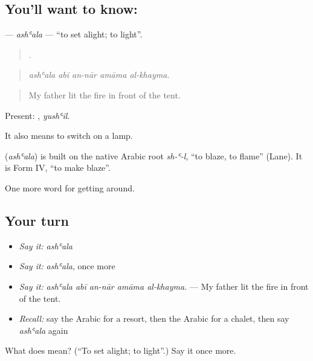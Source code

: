 \subsection*{You'll want to know: }
\textbf{} — \emph{ashʿala} — \textquotedblleft{}to set alight; to light\textquotedblright{}.

\begin{quote}
    .
\end{quote}

\begin{quote}
\emph{ashʿala abī an-nār amāma al-khayma.}
\end{quote}

\begin{quote}
My father lit the fire in front of the tent.
\end{quote}

Present: , \emph{yushʿil}.

It also means to switch on a lamp.

\begin{cousinweb}
\textbf{} (\emph{ashʿala}) is built on the native Arabic root \emph{sh-ʿ-l}, \textquotedblleft{}to blaze, to flame\textquotedblright{} (Lane). It is Form IV, \textquotedblleft{}to make blaze\textquotedblright{}.
\end{cousinweb}

\begin{grammarlens}[title={What you've built}]
One more word for getting around.
\end{grammarlens}

\subsection*{Your turn}
\begin{itemize}
\raggedright
  \item \emph{Say it:} \emph{ashʿala}
  \item \emph{Say it:} \emph{ashʿala}, once more
  \item \emph{Say it:} \emph{ashʿala abī an-nār amāma al-khayma.} — My father lit the fire in front of the tent.
  \item \emph{Recall:} say the Arabic for a resort, then the Arabic for a chalet, then say \emph{ashʿala} again
\end{itemize}

\begin{tcolorbox}[breakable,colback=teal!4,colframe=teal!35!black,title={Before you move on}]
What does  mean? (\textquotedblleft{}To set alight; to light\textquotedblright{}.) Say it once more.
\end{tcolorbox}

